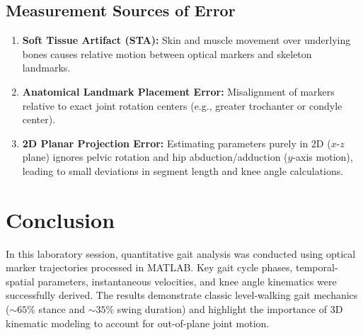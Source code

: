 \documentclass[12pt,a4paper]{article}
\begin{document}
\subsection{Measurement Sources of Error}
\begin{enumerate}
    \item \textbf{Soft Tissue Artifact (STA):} Skin and muscle movement over underlying bones causes relative motion between optical markers and skeleton landmarks.
    \item \textbf{Anatomical Landmark Placement Error:} Misalignment of markers relative to exact joint rotation centers (e.g., greater trochanter or condyle center).
    \item \textbf{2D Planar Projection Error:} Estimating parameters purely in 2D ($x$-$z$ plane) ignores pelvic rotation and hip abduction/adduction ($y$-axis motion), leading to small deviations in segment length and knee angle calculations.
\end{enumerate}

\section{Conclusion}
In this laboratory session, quantitative gait analysis was conducted using optical marker trajectories processed in MATLAB. Key gait cycle phases, temporal-spatial parameters, instantaneous velocities, and knee angle kinematics were successfully derived. The results demonstrate classic level-walking gait mechanics ($\sim 65\%$ stance and $\sim 35\%$ swing duration) and highlight the importance of 3D kinematic modeling to account for out-of-plane joint motion.
\end{document}
